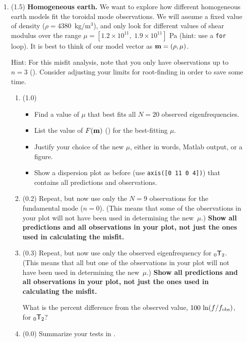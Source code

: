 \documentclass[11pt,titlepage,fleqn]{article}
\newcommand{\tnl}[2]{\mbox{$_{#1}\ssT_{#2}$}}
\begin{document}
\begin{enumerate}
\item (1.5) {\bf Homogeneous earth.} We want to explore how different homogeneous earth models fit the toroidal mode observations. We will assume a fixed value of density ($\rho = 4380$~kg/m$^3$), and only look for different values of shear modulus over the range $\mu = [1.2\times 10^{11},\; 1.9 \times 10^{11}]$ Pa (hint: use a {\tt for} loop). It is best to think of our model vector as $\mbox{${\bf m}$} = (\rho, \mu)$.

Hint: For this misfit analysis, note that you only have observations up to $n = 3$ (). Consider adjusting your limits for root-finding in order to save some time.

\begin{enumerate}
\item (1.0)
\begin{itemize}
\item Find a value of $\mu$ that best fits all $N=20$ observed eigenfrequencies.
\item List the value of $F(\mbox{${\bf m}$})$ () for the best-fitting $\mu$.
\item Justify your choice of the new $\mu$, either in words, Matlab output, or a figure.
\item Show a dispersion plot as before (use \verb+axis([0 11 0 4])+) that contains all predictions and observations.
\end{itemize}

\item (0.2) Repeat, but now use only the $N = 9$ observations for the fundamental mode ($n=0$). (This means that some of the observations in your plot will not have been used in determining the new~$\mu$.)
{\bf Show all predictions and all observations in your plot, not just the ones used in calculating the misfit.}

\item (0.3) Repeat, but now use only the observed eigenfrequency for \tnl{0}{2}. (This means that all but one of the observations in your plot will not have been used in determining the new~$\mu$.)
{\bf Show all predictions and all observations in your plot, not just the ones used in calculating the misfit.}

What is the percent difference from the observed value, $100\,\ln(f/f_{\rm obs})$, for \tnl{0}{2}?

\item (0.0) Summarize your tests in .
\end{enumerate}


\end{enumerate}
\end{document}
